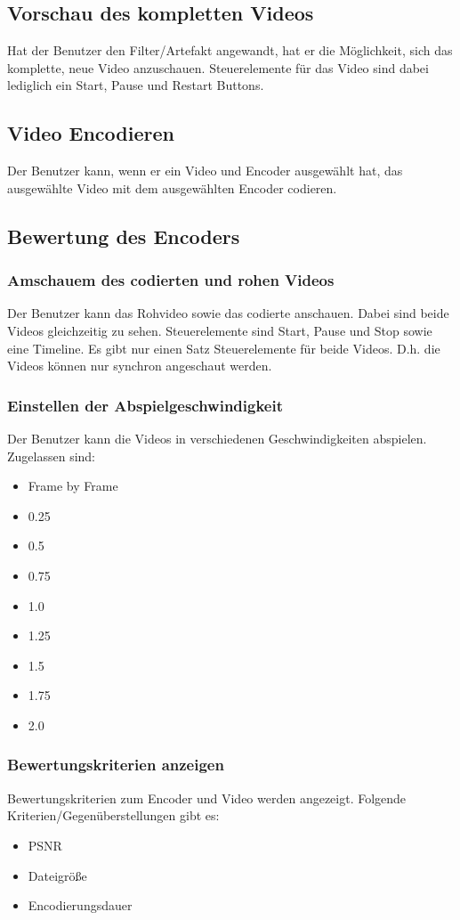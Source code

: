 \documentclass[parskip=full]{scrartcl}
\begin{document}
\subsection{Vorschau des kompletten Videos}
Hat der Benutzer den Filter/Artefakt angewandt, hat er die Möglichkeit, sich das komplette, neue
Video anzuschauen. Steuerelemente für das Video sind dabei lediglich ein Start, Pause und Restart Buttons.
\subsection{Video Encodieren}
Der Benutzer kann, wenn er ein Video und Encoder ausgewählt hat, das ausgewählte Video mit dem ausgewählten Encoder codieren.
\subsection{Bewertung des Encoders}
\subsubsection{Amschauem des codierten und rohen Videos}
Der Benutzer kann das Rohvideo sowie das codierte anschauen. Dabei sind beide Videos gleichzeitig zu sehen. Steuerelemente sind Start, Pause und Stop sowie eine Timeline. Es gibt nur einen Satz Steuerelemente für beide Videos. D.h. die Videos können nur synchron angeschaut werden.
\subsubsection{Einstellen der Abspielgeschwindigkeit}
Der Benutzer kann die Videos in verschiedenen Geschwindigkeiten abspielen. Zugelassen sind:
\begin{itemize}
\item Frame by Frame
\item 0.25
\item 0.5
\item 0.75
\item 1.0
\item 1.25
\item 1.5
\item 1.75
\item 2.0
\end{itemize}
\subsubsection{Bewertungskriterien anzeigen}
Bewertungskriterien zum Encoder und Video werden angezeigt. Folgende Kriterien/Gegenüberstellungen gibt es:
\begin{itemize}
\item PSNR
\item Dateigröße
\item Encodierungsdauer
\end{itemize}
\end{document}

